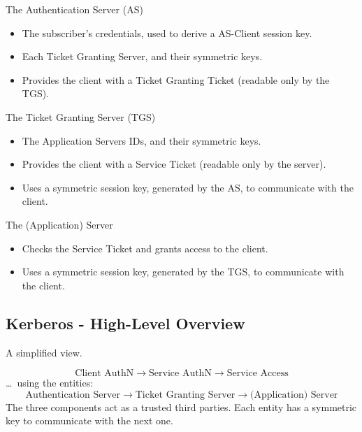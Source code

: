 \begin{multicols}{3}

    The Authentication Server 
    \hspace*{2.5cm}(AS)

\begin{itemize}
    \item The subscriber's credentials, used to derive a AS-Client session key.
    \item Each Ticket Granting Server, and their symmetric keys.
    \item Provides the client with a Ticket Granting Ticket (readable only by the TGS).
\end{itemize}
\columnbreak

The Ticket Granting Server 
\hspace*{2.5cm}(TGS)
\begin{itemize}
    \item The Application Servers IDs, and their symmetric keys.
    \item Provides the client with a Service Ticket (readable only by the server).
    \item Uses a symmetric session key, generated by the AS, to communicate with the client.
\end{itemize}
\columnbreak

The (Application) Server
\begin{itemize}
    \item Checks the Service Ticket and grants access to the client.
    \item Uses a symmetric session key, generated by the TGS, to communicate with the client.
\end{itemize}
\end{multicols}


\subsection{Kerberos - High-Level Overview}
\begin{center}
    A simplified view.
\end{center}
\[
    \boxed{\text{Client AuthN}} \rightarrow \boxed{\text{Service AuthN}} \rightarrow \boxed{\text{Service Access}}
\]
\dots \ using the entities:
\[
    \text{Authentication Server} \rightarrow \text{Ticket Granting Server} \rightarrow \text{(Application) Server}
\]
The three components act as a trusted third parties. Each entity has a symmetric key to communicate with the next one.


